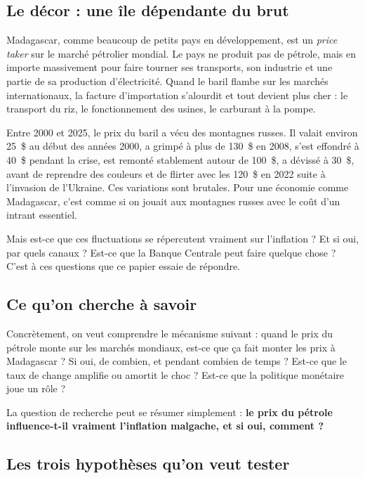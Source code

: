 \documentclass[12pt,a4paper]{article}
\begin{document}
\subsection{Le décor : une île dépendante du brut}

Madagascar, comme beaucoup de petits pays en développement, est un \emph{price taker} sur le marché pétrolier mondial. Le pays ne produit pas de pétrole, mais en importe massivement pour faire tourner ses transports, son industrie et une partie de sa production d'électricité. Quand le baril flambe sur les marchés internationaux, la facture d'importation s'alourdit et tout devient plus cher : le transport du riz, le fonctionnement des usines, le carburant à la pompe.

Entre 2000 et 2025, le prix du baril a vécu des montagnes russes. Il valait environ 25~\$ au début des années 2000, a grimpé à plus de 130~\$ en 2008, s'est effondré à 40~\$ pendant la crise, est remonté stablement autour de 100~\$, a dévissé à 30~\$, avant de reprendre des couleurs et de flirter avec les 120~\$ en 2022 suite à l'invasion de l'Ukraine. Ces variations sont brutales. Pour une économie comme Madagascar, c'est comme si on jouait aux montagnes russes avec le coût d'un intrant essentiel.

Mais est-ce que ces fluctuations se répercutent vraiment sur l'inflation ? Et si oui, par quels canaux ? Est-ce que la Banque Centrale peut faire quelque chose ? C'est à ces questions que ce papier essaie de répondre.

\subsection{Ce qu'on cherche à savoir}

Concrètement, on veut comprendre le mécanisme suivant : quand le prix du pétrole monte sur les marchés mondiaux, est-ce que ça fait monter les prix à Madagascar ? Si oui, de combien, et pendant combien de temps ? Est-ce que le taux de change amplifie ou amortit le choc ? Est-ce que la politique monétaire joue un rôle ?

La question de recherche peut se résumer simplement : \textbf{le prix du pétrole influence-t-il vraiment l'inflation malgache, et si oui, comment ?}

\subsection{Les trois hypothèses qu'on veut tester}
\end{document}
